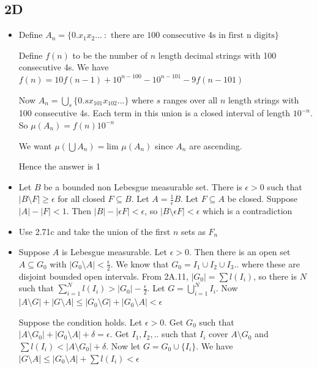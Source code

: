 \documentclass{article}
\begin{document}
\subsection*{2D}
\begin{itemize}
    \item [1]
    Define $A_n=\{0.x_1x_2... \ : \text{ there are 100 consecutive 4s in first n digits}\}$

    Define $f(n)$ to be the number of $n$ length decimal strings with 100 consecutive 4s. We have $f(n)=10f(n-1)+10^{n-100}-10^{n-101}-9f(n-101)$

    Now $A_n=\bigcup_s\{0.sx_{101}x_{102}...\}$ where $s$ ranges over all $n$ length strings with 100 consecutive 4s. Each term in this union is a closed interval of length $10^{-n}$. So $\mu(A_n)=f(n) 10^{-n}$

    We want $\mu(\bigcup A_n)=\text{lim }\mu(A_n)$ since $A_n$ are ascending.

    Hence the answer is 1

    \item [2] Let $B$ be a bounded non Lebesgue measurable set. There is $\epsilon>0$ such that $|B\setminus F| \geq \epsilon$ for all closed $F \subseteq B$. Let $A=\frac{1}{\epsilon}B$. Let $F \subseteq A$ be closed. Suppose $|A|-|F|<1$. Then $|B|-|\epsilon F|<\epsilon$, so $|B \setminus \epsilon F| < \epsilon$ which is a contradiction

    \item [5] Use 2.71c and take the union of the first $n$ sets as $F_n$

    \item [6] Suppose $A$ is Lebesgue measurable. Let $\epsilon > 0$. Then there is an open set $A \subseteq G_0$ with $|G_0 \setminus A| < \frac{\epsilon}{2}$. We know that $G_0 = I_1 \cup I_2 \cup I_3..$ where these are disjoint bounded open intervals. From 2A.11, $|G_0|=\sum l(I_i)$, so there is $N$ such that $\sum_{i=1}^N l(I_i)>|G_0|-\frac{\epsilon}{2}$. Let $G = \bigcup_{i=1}^NI_i$. Now $|A \setminus G|+|G \setminus A| \leq |G_0 \setminus G| + |G_0 \setminus A| < \epsilon$

    Suppose the condition holds. Let $\epsilon > 0$. Get $G_0$ such that $|A \setminus G_0|+|G_0 \setminus A| + \delta = \epsilon$. Get $I_1,I_2,..$ such that $I_i$ cover $A \setminus G_0$ and $\sum l(I_i)<|A \setminus G_0| + \delta$. Now let $G = G_0 \cup \{I_i\}$. We have $|G \setminus A| \leq |G_0 \setminus A|+\sum l(I_i)<\epsilon$



\end{itemize}
\end{document}
